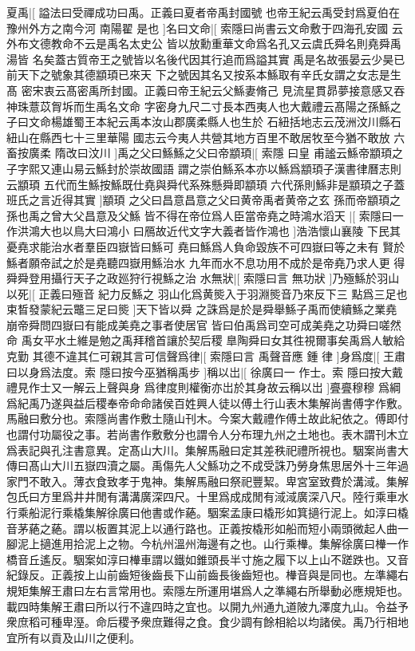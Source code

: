 夏禹|[%
謚法曰受禪成功曰禹。正義曰夏者帝禹封國號%
也帝王紀云禹受封爲夏伯在豫州外方之南今河%
%
南陽翟%
是也%
]名曰文命|[%
索隱曰尚書云文命敷于四海孔安國%
云外布文德教命不云是禹名太史公%
%
皆以放勳重華文命爲名孔又云虞氏舜名則堯舜禹湯皆%
名矣蓋古質帝王之號皆以名後代因其行追而爲謚其實%
%
禹是名故張晏云少昊已前天下之號象其德顓頊已來天%
下之號因其名又按系本鯀取有辛氏女謂之女志是生髙%
%
密宋衷云髙密禹所封國。正義曰帝王紀云父鯀妻脩己%
見流星貫昴夢接意感又吞神珠薏苡胷坼而生禹名文命%
%
字密身九尺二寸長本西夷人也大戴禮云髙陽之孫鯀之%
子曰文命楊雄蜀王本紀云禹本汝山郡廣柔縣人也生於%
%
石紐括地志云茂洲汶川縣石紐山在縣西七十三里華陽%
國志云今夷人共營其地方百里不敢居牧至今猶不敢放%
%
六畜按廣柔%
隋改曰汶川%
]禹之父曰鯀鯀之父曰帝顓頊|[%
索隱%
曰皇%
%
甫謐云鯀帝顓頊之子字熙又連山易云鯀封於崇故國語%
謂之崇伯鯀系本亦以鯀爲顓頊子漢書律曆志則云顓頊%
%
五代而生鯀按鯀既仕堯與舜代系殊懸舜即顓頊%
六代孫則鯀非是顓頊之子蓋班氏之言近得其實%
]顓頊%
之父曰昌意昌意之父曰黄帝禹者黄帝之玄%
孫而帝顓頊之孫也禹之曾大父昌意及父鯀%
皆不得在帝位爲人臣當帝堯之時鴻水滔天%
|[%
索隱曰一作洪鴻大也以鳥大曰鴻小%
曰鴈故近代文字大義者皆作鴻也%
]浩浩懷山襄陵%
下民其憂堯求能治水者羣臣四嶽皆曰鯀可%
堯曰鯀爲人負命毀族不可四嶽曰等之未有%
賢於鯀者願帝試之於是堯聽四嶽用鯀治水%
九年而水不息功用不成於是帝堯乃求人更%
得舜舜登用攝行天子之政廵狩行視鯀之治%
水無狀|[%
索隱曰言%
無功狀%
]乃殛鯀於羽山以死|[%
正義曰殛音%
紀力反鯀之%
%
羽山化爲黄熋入于羽淵熋音乃來反下三%
點爲三足也束晳發蒙紀云鼈三足曰熋%
]天下皆以舜%
之誅爲是於是舜舉鯀子禹而使續鯀之業堯%
崩帝舜問四嶽曰有能成美堯之事者使居官%
皆曰伯禹爲司空可成美堯之功舜曰嗟然命%
禹女平水土維是勉之禹拜稽首讓於契后稷%
臯陶舜曰女其徃視爾事矣禹爲人敏給克勤%
其德不違其仁可親其言可信聲爲律|[%
索隱曰言%
禹聲音應%
%
鍾%
律%
]身爲度|[%
王肅曰以身爲法度。索%
隱曰按今巫猶稱禹步%
]稱以岀|[%
徐廣曰一%
作士。索%
%
隱曰按大戴禮見作士又一解云上聲與身%
爲律度則權衡亦岀於其身故云稱以岀%
]亹亹穆穆%
爲綱爲紀禹乃遂與益后稷奉帝命命諸侯百姓興人徒以傅土行山表木集解尚書傅字作敷。馬融曰敷分也。索隱尚書作敷土隨山刊木。今案大戴禮作傅土故此紀依之。傅即付也謂付功屬役之事。若尚書作敷敷分也謂令人分布理九州之土地也。表木謂刊木立爲表記與孔注書意異。定髙山大川。集解馬融曰定其差秩祀禮所視也。駰案尚書大傳曰髙山大川五嶽四瀆之屬。禹傷先人父鯀功之不成受誅乃勞身焦思居外十三年過家門不敢入。薄衣食致孝于鬼神。集解馬融曰祭祀豐絜。卑宮室致費於溝淢。集解包氏曰方里爲井井閒有溝溝廣深四尺。十里爲成成閒有淢淢廣深八尺。陸行乘車水行乘船泥行乘橇集解徐廣曰他書或作蕝。駰案孟康曰橇形如箕擿行泥上。如淳曰橇音茅蕝之蕝。謂以板置其泥上以通行路也。正義按橇形如船而短小兩頭微起人曲一腳泥上擿進用拾泥上之物。今杭州溫州海邊有之也。山行乘檋。集解徐廣曰檋一作橋音丘遙反。駰案如淳曰檋車謂以鐵如錐頭長半寸施之履下以上山不蹉跌也。又音紀錄反。正義按上山前齒短後齒長下山前齒長後齒短也。檋音與是同也。左準繩右規矩集解王肅曰左右言常用也。索隱左所運用堪爲人之準繩右所舉動必應規矩也。載四時集解王肅曰所以行不違四時之宜也。以開九州通九道陂九澤度九山。令益予衆庶稻可種卑溼。命后稷予衆庶難得之食。食少調有餘相給以均諸侯。禹乃行相地宜所有以貢及山川之便利。

